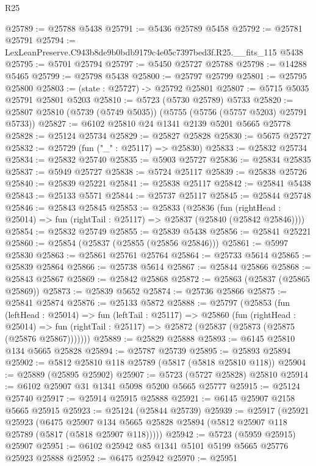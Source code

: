 \begin{lexlean}{R25}
\begin{coremodule}
@25789 := @25788 @5438
@25791 := @5436 @25789 @5458
@25792 := @25781 @25791
@25794 := LexLeanPreserve.C943b8de9b0bdb9179c4e05c7397bed3f.R25.__fits_115 @5438
@25795 := @5701 @25794
@25797 := @5450 @25727 @25788
@25798 := @14288 @5465
@25799 := @25798 @5438
@25800 := @25797 @25799
@25801 := @25795 @25800
@25803 := (state : @25727) -> @25792 @25801
@25807 := @5715 @5035 @25791 @25801 @5203
@25810 := @5723 (@5730 @25789) @5733
@25820 := @25807 @25810 (@5739 (@5749 @5035)) (@5755 (@5756 (@5757 @5203) @25791 @5733))
@25827 := @6102 @25810 @24 @1341 @2139 @5201 @5665 @25778
@25828 := @25124 @25734
@25829 := @25827 @25828
@25830 := @5675 @25727
@25832 := @25729 (fun ("_" : @25117) => @25830)
@25833 := @25832 @25734
@25834 := @25832 @25740
@25835 := @5903 @25727
@25836 := @25834 @25835
@25837 := @5949 @25727
@25838 := @5724 @25117
@25839 := @25838 @25726
@25840 := @25839 @25221
@25841 := @25838 @25117
@25842 := @25841 @5438
@25843 := @25133 @5571
@25844 := @25737 @25117
@25845 := @25844 @25748
@25846 := @25843 @25845
@25853 := @25833
    (@25836
      (fun (rightHead : @25014) => fun (rightTail : @25117) => @25837 (@25840 (@25842 @25846))))
@25854 := @25832 @25749
@25855 := @25839 @5438
@25856 := @25841 @25221
@25860 := @25854 (@25837 (@25855 (@25856 @25846)))
@25861 := @5997 @25830
@25863 := @25861 @25761 @25764
@25864 := @25733 @5614
@25865 := @25839 @25864
@25866 := @25738 @5614
@25867 := @25844 @25866
@25868 := @25843 @25867
@25869 := @25842 @25868
@25872 := @25863 (@25837 (@25865 @25869))
@25873 := @25839 @5652
@25874 := @25736 @25866
@25875 := @25841 @25874
@25876 := @25133 @5872
@25888 := @25797
    (@25853
      (fun (leftHead : @25014) =>
      fun (leftTail : @25117) =>
      @25860
        (fun (rightHead : @25014) =>
        fun (rightTail : @25117) => @25872 (@25837 (@25873 (@25875 (@25876 @25867)))))))
@25889 := @25829 @25888
@25893 := @6145 @25810 @134 @5665 @25828
@25894 := @25787 @25739
@25895 := @25893 @25894
@25902 := @5812 @25810 @118 @25789 (@5817 (@5818 @25810 @118))
@25904 := @25889 (@25895 @25902)
@25907 := @5723 (@5727 @25828) @25810
@25914 := @6102 @25907 @31 @1341 @5098 @5200 @5665 @25777
@25915 := @25124 @25740
@25917 := @25914 @25915 @25888
@25921 := @6145 @25907 @2158 @5665 @25915
@25923 := @25124 (@25844 @25739)
@25939 := @25917
    (@25921
      @25923
      (@6475
        @25907
        @134
        @5665
        @25828
        @25894
        (@5812 @25907 @118 @25789 (@5817 (@5818 @25907 @118)))))
@25942 := @5723 (@5959 @25915) @25907
@25951 := @6102 @25942 @85 @1341 @5101 @5199 @5665 @25776 @25923 @25888
@25952 := @6475 @25942
@25970 := @25951

\end{coremodule}
\end{lexlean}
